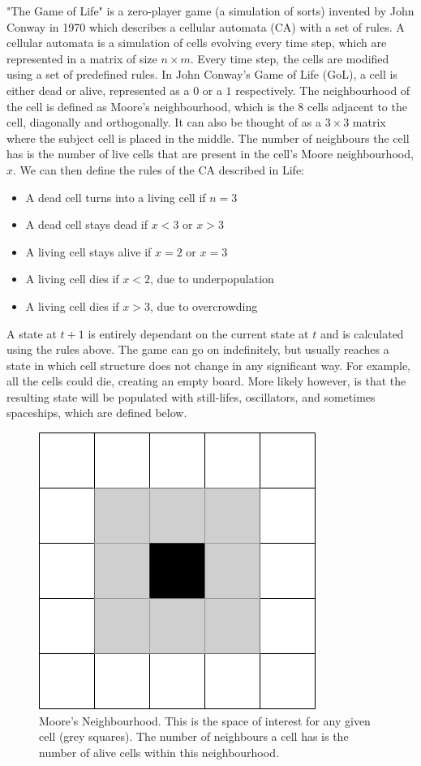 \documentclass{l4proj}
\begin{document}
"The Game of Life" is a zero-player game (a simulation of sorts) invented by John Conway in 1970 which describes a cellular automata (CA) with a set of rules. A cellular automata is a simulation of cells evolving every time step, which are represented in a matrix of size $n\times m$. Every time step, the cells are modified using a set of predefined rules. In John Conway's Game of Life (GoL), a cell is either dead or alive, represented as a $0$ or a $1$ respectively. The neighbourhood of the cell is defined as Moore's neighbourhood, which is the 8 cells adjacent to the cell, diagonally and orthogonally. It can also be thought of as a $3\times 3$ matrix where the subject cell is placed in the middle. The number of neighbours the cell has is the number of live cells that are present in the cell's Moore neighbourhood, $x$. We can then define the rules of the CA described in Life:

\begin{itemize}
    \item A dead cell turns into a living cell if $n = 3$
    \item A dead cell stays dead if $x < 3$ or $x > 3$
    \item A living cell stays alive if $x = 2$ or $x = 3$
    \item A living cell dies if $x < 2$, due to underpopulation
    \item A living cell dies if $x > 3$, due to overcrowding
\end{itemize}

A state at $t+1$ is entirely dependant on the current state at $t$ and is calculated using the rules above. The game can go on indefinitely, but usually reaches a state in which cell structure does not change in any significant way. For example, all the cells could die, creating an empty board. More likely however, is that the resulting state will be populated with still-lifes, oscillators, and sometimes spaceships, which are defined below.

\begin{figure}[h]
\centering
\includegraphics[width=0.4\linewidth]{dissertation/images/diagrams/moores_neighbourhood.png}
\caption{Moore's Neighbourhood. This is the space of interest for any given cell (grey squares). The number of neighbours a cell has is the number of alive cells within this neighbourhood.}
\label{fig:subim1}

\end{figure}
\end{document}
